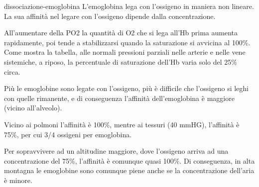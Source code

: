 \documentclass[preview]{standalone}
\begin{document}
\begin{snippet}{dissociazione-emoglobina}
    L'emoglobina lega con l'ossigeno in maniera non lineare.
    La sua affinità nel legare con l'ossigeno dipende dalla concentrazione.
    
    All'aumentare della PO2 la quantità di O2 che si lega all'Hb
    prima aumenta rapidamente, poi tende a stabilizzarsi quando la saturazione si avvicina al 100\%.
    Come mostra la tabella, alle normali pressioni parziali nelle
    arterie e nelle vene sistemiche, a riposo, la percentuale di saturazione dell'Hb varia solo del 25\% circa.
    
    Più le emoglobine sono legate con l'ossigeno, più è difficile che l'ossigeno si leghi con quelle rimanente,
    e di conseguenza l'affinità dell'emoglobina è maggiore (vicino all'alveolo).
    
    Vicino ai polmoni l'affinità è 100\%, mentre ai tessuri (40 mmHG), l'affinità è 75\%, per
    cui 3/4 ossigeni per emoglobina.
    
    Per sopravvivere ad un altitudine maggiore, dove l'ossigeno arriva ad una concentrazione del
    75\%, l'affinità è comunque quasi 100\%. Di conseguenza, in alta montagna le emoglobine sono comunque
    piene anche se la concentrazione dell'aria è minore.
\end{snippet}
\end{document}
